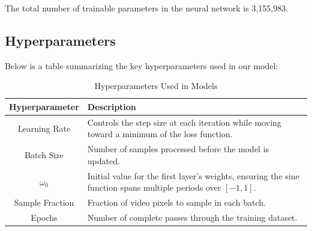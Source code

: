 \documentclass{ioereport}
\begin{document}
The total number of trainable parameters in the neural network is 3,155,983.

\subsection{Hyperparameters}
 Below is a table summarizing the key hyperparameters used in our model:


\begin{table}[H]
    \caption{Hyperparameters Used in Models}
    \centering
    \begin{tabular}{|c|p{11cm}|}
    \hline
    \textbf{Hyperparameter} & \textbf{Description} \\
    \hline
    Learning Rate & Controls the step size at each iteration while moving toward a minimum of the loss function. \\
    \hline
    Batch Size & Number of samples processed before the model is updated. \\
    \hline
    \( \omega_0 \) & Initial value for the first layer's weights, ensuring the sine function spans multiple periods over \([-1, 1]\). \\
    \hline
    Sample Fraction & Fraction of video pixels to sample in each batch. \\
    \hline
    Epochs & Number of complete passes through the training dataset. \\
    \hline
    \end{tabular}
    \label{tab:hyperparameters-description}
\end{table}
\end{document}
